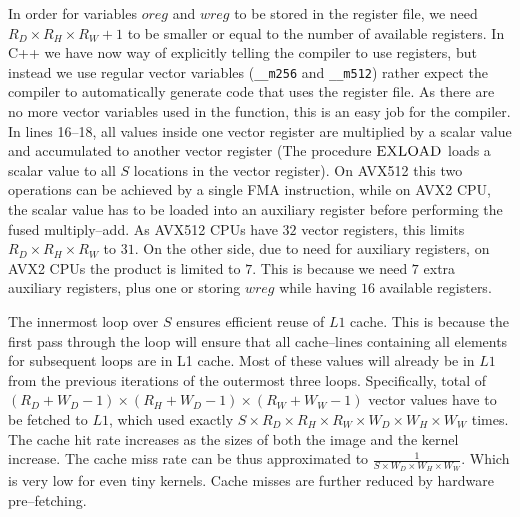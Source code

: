   In order for variables $oreg$ and $wreg$ to be stored in the
  register file, we need $R_D \times R_H \times R_W + 1$ to be smaller
  or equal to the number of available registers.  In C++ we have now
  way of explicitly telling the compiler to use registers, but instead
  we use regular vector variables (\texttt{\_\_m256} and
  \texttt{\_\_m512}) rather expect the compiler to automatically
  generate code that uses the register file.  As there are no more
  vector variables used in the function, this is an easy job for the
  compiler.  In lines 16--18, all values inside one vector register
  are multiplied by a scalar value and accumulated to another vector
  register (The procedure $\textnormal{\scshape EXLOAD}$ loads a scalar value to all
  $S$ locations in the vector register).  On AVX512 this two
  operations can be achieved by a single FMA instruction, while on
  AVX2 CPU, the scalar value has to be loaded into an auxiliary
  register before performing the fused multiply--add.  As AVX512 CPUs
  have $32$ vector registers, this limits $R_D \times R_H \times R_W$
  to $31$.  On the other side, due to need for auxiliary registers, on
  AVX2 CPUs the product is limited to $7$.  This is because we need
  $7$ extra auxiliary registers, plus one or storing $wreg$ while
  having $16$ available registers.

  The innermost loop over $S$ ensures efficient reuse of $L1$ cache.
  This is because the first pass through the loop will ensure that all
  cache--lines containing all elements for subsequent loops are in L1
  cache.  Most of these values will already be in $L1$ from the
  previous iterations of the outermost three loops.  Specifically,
  total of $(R_D+W_D-1) \times (R_H+W_D-1) \times (R_W+W_W-1)$ vector
  values have to be fetched to $L1$, which used exactly $S \times R_D
  \times R_H \times R_W \times W_D \times W_H \times W_W$ times.  The
  cache hit rate increases as the sizes of both the image and the
  kernel increase.  The cache miss rate can be thus approximated to
  $\frac{1}{S \times W_D \times W_H \times W_W}$.  Which is very low
  for even tiny kernels.  Cache misses are further reduced by hardware
  pre--fetching.

